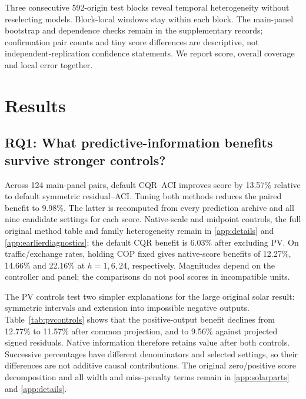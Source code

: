 Three consecutive 592-origin test blocks reveal temporal heterogeneity without
reselecting models. Block-local windows stay within each block. The main-panel
bootstrap and dependence checks remain in the supplementary records; confirmation
pair counts and tiny score differences are descriptive, not independent-replication
confidence statements. We report score, overall coverage and local error together.

\section{Results}
\subsection{RQ1: What predictive-information benefits survive stronger controls?}
Across 124 main-panel pairs, default CQR--ACI improves score by 13.57\% relative
to default symmetric residual--ACI. Tuning both methods reduces the paired benefit
to 9.98\%. The latter is recomputed from every prediction archive and all nine
candidate settings for each score. Native-scale and midpoint controls, the full
original method table and family heterogeneity remain in \ref{app:details} and
\ref{app:earlierdiagnostics}; the default CQR benefit is 6.03\% after excluding PV.
On traffic/exchange rates, holding COP fixed gives native-score benefits of
12.27\%, 14.66\% and 22.16\% at $h=1,6,24$, respectively. Magnitudes depend on the
controller and panel; the comparisons do not pool scores in incompatible units.

The PV controls test two simpler explanations for the large original solar result:
symmetric intervals and extension into impossible negative outputs. Table~\ref{tab:pvcontrols}
shows that the positive-output benefit declines from 12.77\% to 11.57\% after
common projection, and to 9.56\% against projected signed residuals. Native information
therefore retains value after both controls. Successive percentages have different
denominators and selected settings, so their differences are not additive causal
contributions. The original zero/positive score decomposition and all width and
miss-penalty terms remain in \ref{app:solarparts} and \ref{app:details}.

\begin{table}[!htbp]\centering\scriptsize
\caption{PV construction controls, all 32 pairs, validation-tuned. Gains are mean
paired CQR improvements over the named baseline (\%); coverages are percent.
High forecast is an issue-time observable prefix-median split.}
\label{tab:pvcontrols}\end{table}

